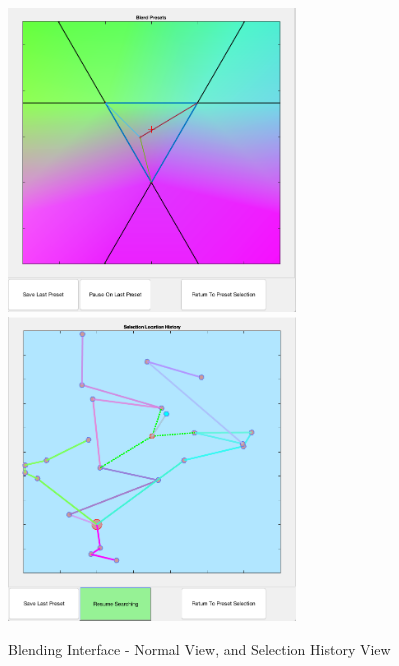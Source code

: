 \documentclass[11pt, oneside]{report}   	%
\begin{document}
\begin{figure}[h] 
	\centering
	\hspace*{-0.2cm}
	\includegraphics[width = 3.0in]{BlendingInterface1.png}
	\hspace*{0.2cm}
	\includegraphics[width = 3.0in]{BlendingInterface2.png}
	\caption{Blending Interface - Normal View, and Selection History View}
	\label{fig:BlendingInterface}
\end{figure}
\end{document}
